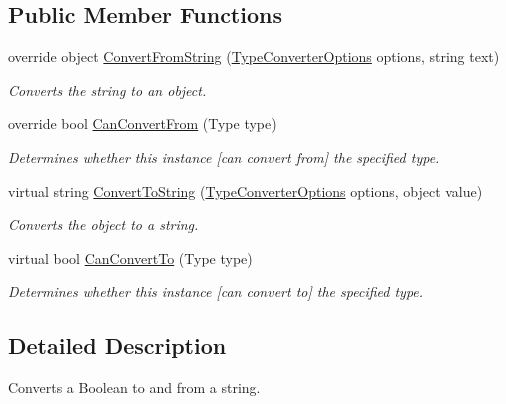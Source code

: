 \subsection*{Public Member Functions}
\begin{DoxyCompactItemize}
\item 
override object \hyperlink{a00025_abc77c631974272fd1dfe3fe4fcc3bf28}{Convert\-From\-String} (\hyperlink{a00154}{Type\-Converter\-Options} options, string text)
\begin{DoxyCompactList}\small\item\em Converts the string to an object. \end{DoxyCompactList}\item 
override bool \hyperlink{a00025_a0be20573af4ee53409bb437125a64268}{Can\-Convert\-From} (Type type)
\begin{DoxyCompactList}\small\item\em Determines whether this instance \mbox{[}can convert from\mbox{]} the specified type. \end{DoxyCompactList}\item 
virtual string \hyperlink{a00068_a36cb2f9b24f15a671293f3a722324c27}{Convert\-To\-String} (\hyperlink{a00154}{Type\-Converter\-Options} options, object value)
\begin{DoxyCompactList}\small\item\em Converts the object to a string. \end{DoxyCompactList}\item 
virtual bool \hyperlink{a00068_acb65bd8c8199d88d5b1629ae35d18514}{Can\-Convert\-To} (Type type)
\begin{DoxyCompactList}\small\item\em Determines whether this instance \mbox{[}can convert to\mbox{]} the specified type. \end{DoxyCompactList}\end{DoxyCompactItemize}


\subsection{Detailed Description}
Converts a Boolean to and from a string. 



